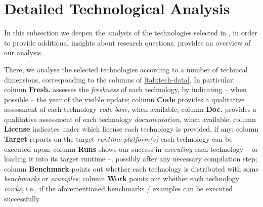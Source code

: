 \documentclass[12pt,a4paper,openright,twoside]{book}
\begin{document}
\section{Detailed Technological Analysis}\label{sec:table-evaluation}



In this subsection we deepen the analysis of the technologies selected in \cite{lptech4mas-jaamas35}, in order to provide additional insights about research questions.
%
 provides an overview of our analysis.

There, we analyse the selected technologies according to a number of technical dimensions, corresponding to the columns of \cref{tab:tech-data}.
%
In particular:
column \textbf{Fresh.} assesses the \emph{freshness} of each technology, by indicating -- when possible -- the year of the visible update;
column \textbf{Code} provides a qualitative assessment of each technology \emph{code base}, when available;
column \textbf{Doc.} provides a qualitative assessment of each technology \emph{documentation}, when available;
column \textbf{License} indicates under which license each technology is provided, if any;
column \textbf{Target} reports on the target \emph{runtime platform(s)} each technology can be executed upon;
column \textbf{Runs} shows our success in \emph{executing} each technology -- or loading it into its target runtime --, possibly after any necessary compilation step;
column \textbf{Benchmark} points out whether each technology is distributed with some \emph{benchmarks} or \emph{examples};
column \textbf{Work} points out whether each technology \emph{works}, i.e., if the aforementioned benchmarks / examples can be executed successfully.
\end{document}
